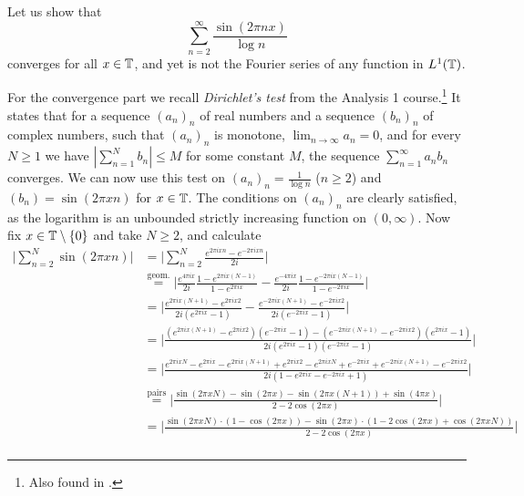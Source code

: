 \documentclass[a4paper, 12pt]{article}
\begin{document}
\begin{Exercise}
    Let us show that
    \begin{equation}
        \label{eq:6-series}
        \sum_{n=2}^{\infty}\frac{\sin(2\pi nx)}{\log n}
    \end{equation}
    converges for all $x \in \mathbb{T}$, and yet is not the Fourier series of any
    function in $L^1(\mathbb{T})$.

    For the convergence part we recall \emph{Dirichlet's test} from the
    Analysis 1 course.\footnote{Also found in \cite[p.\ 259]{Voxman1981}.} It
    states that for a sequence $(a_n)_n$ of real numbers and a sequence
    $(b_n)_n$ of complex numbers, such that $(a_n)_n$ is monotone, $\lim_{n \to
    \infty}a_n = 0$, and for every $N\geq 1$ we have $|\sum_{n=1}^{N}b_n| \leq
    M$ for some constant $M$, the sequence $\sum_{n = 1}^{\infty}a_nb_n$
    converges.
    We can now use this test on $(a_n)_n = \frac{1}{\log n}$ ($n \geq 2$) and
    $(b_n) = \sin(2\pi xn)$ for $x \in \mathbb{T}$.  The conditions on $(a_n)_n$ are
    clearly satisfied, as the logarithm is an unbounded strictly increasing
    function on $(0, \infty)$.  Now fix $x \in \mathbb{T}\setminus\left\{ 0 \right\}$
    and take $N \geq 2$, and calculate
    \begin{align*}
        \Big| \sum_{n = 2}^{N} \sin(2\pi xn) \Big|
        &= \Big| \sum_{n = 2}^{N} \frac{e^{2\pi i xn} - e^{-2\pi i xn}}{2i} \Big| \\
        &\overset{\text{geom.}}{=} \Big| \frac{e^{4\pi ix}}{2i} \frac{1 - e^{2\pi i x (N-1)}}{1 - e^{2\pi ix}} -
        \frac{e^{-4\pi ix}}{2i} \frac{1 - e^{-2\pi i x (N-1)}}{1 - e^{-2\pi ix}} \Big| \\
        &= \Big| \frac{e^{2\pi i x(N+1)} - e^{2\pi i x 2}}{2i (e^{2\pi ix} - 1)} -
        \frac{e^{-2\pi i x(N+1)} - e^{-2\pi i x 2}}{2i (e^{-2\pi ix} - 1)} \Big| \\
        &= \Big| \frac{(e^{2\pi ix(N+1)} - e^{2\pi ix2})(e^{-2\pi ix} - 1) - (e^{-2\pi ix(N+1)} - e^{-2\pi ix2}) (e^{2\pi ix} - 1)}{2i (e^{2\pi ix} - 1) (e^{-2\pi ix} - 1)} \Big| \\
        &= \Big| \frac{e^{2\pi ixN} - e^{2\pi ix} - e^{2\pi ix(N+1)} + e^{2\pi ix2} - e^{2\pi ixN} + e^{-2\pi ix} + e^{-2\pi ix(N+1)} - e^{-2\pi ix 2}}{2i (1 - e^{2\pi ix} - e^{-2\pi ix} + 1)} \Big| \\
        &\overset{\text{pairs}}{=} \Big| \frac{\sin(2\pi xN) - \sin(2\pi x) - \sin(2\pi x(N+1)) + \sin(4\pi x)}{2 - 2\cos(2\pi x)} \Big| \\
        &= \Big| \frac{\sin(2\pi xN) \cdot (1 - \cos(2\pi x)) -\sin(2\pi x) \cdot (1 - 2\cos(2\pi x) + \cos(2\pi xN))}{2 - 2\cos(2\pi x)} \Big| \\

\end{align*}
\end{Exercise}
\end{document}
